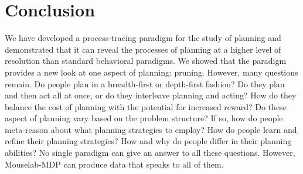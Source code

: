 \documentclass[11pt]{article} %
\newcommand{\fl}[1]{\textcolor{red}{\textsc{[#1 -Falk]}}}
\newcommand{\pmk}[1]{\textcolor{blue}{\textsc{[#1 -Paul]}}}
\begin{document}



\section{Conclusion}
We have developed a process-tracing paradigm for the study of planning and demonstrated that it can reveal the processes of planning at a higher level of resolution than standard behavioral paradigms. We showed that the paradigm provides a new look at one aspect of planning: pruning. However, many questions remain. Do people plan in a breadth-first or depth-first fashion? Do they plan and then act all at once, or do they interleave planning and acting? How do they balance the cost of planning with the potential for increased reward? Do these aspect of planning vary based on the problem structure? If so, how do people meta-reason about what planning strategies to employ? How do people learn and refine their planning strategies? How and why do people differ in their planning abilities?  No single paradigm can give an answer to all these questions. However, Mouselab-MDP can produce data that speaks to all of them.
\end{document}
